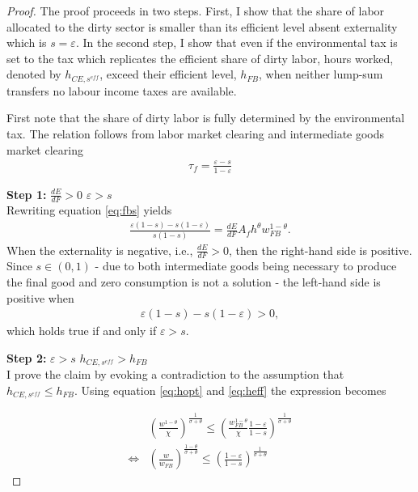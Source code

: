 \begin{proof}
The proof proceeds in two steps. First, I show that the share of labor allocated to the dirty sector is smaller than its efficient level absent externality which is $s=\varepsilon$.
In the second step, I show that even if the environmental tax is set to the tax which replicates the efficient share of dirty labor, hours worked, denoted by $h_{CE, s^{eff}}$, exceed their efficient level, $h_{FB}$, when neither lump-sum transfers no labour income taxes are available. 

First note that the share of dirty labor is fully determined by the environmental tax. The relation follows from labor market clearing and intermediate goods market clearing 
\begin{align}
\tau_f = \frac{\varepsilon-s}{1-\varepsilon}\label{eq:tauf}
\end{align}

\textbf{Step 1:} $\frac{dE}{dF}>0$ \ar $\varepsilon>s$\\
Rewriting equation \ref{eq:fbs} yields
\begin{align}
\frac{\varepsilon(1-s)-s(1-\varepsilon)}{s(1-s)}=\frac{dE}{dF}A_fh^\theta w_{FB}^{1-\theta}.
\end{align}
When the externality is negative, i.e., $\frac{dE}{dF}>0$, then the right-hand side is positive.
Since $s\in(0,1)$ - due to both intermediate goods being necessary to produce the final good and zero consumption is not a solution - the left-hand side is positive when
\begin{align}
\varepsilon(1-s)-s(1-\varepsilon)>0,
\end{align}
which holds true if and only if $\varepsilon>s$.

\textbf{Step 2:} $\varepsilon>s$ \ar $h_{CE, s^{eff}}>h_{FB}$\\
I prove the claim by evoking a contradiction to the assumption that $h_{CE, s^{eff}}\leq h_{FB}$. Using equation \ref{eq:hopt} and \ref{eq:heff} the expression becomes

\begin{align}
&\left(\frac{w^{1-\theta}}{\chi}\right)^{\frac{1}{\sigma+\theta}}\leq \left(\frac{w_{FB}^{1-\theta}}{\chi}\frac{1-\varepsilon}{1-s}\right)^\frac{1}{\sigma+\theta}
\\
\Leftrightarrow&\left(\frac{w}{w_{FB}}\right)^{\frac{1-\theta}{\sigma+\theta}}\leq \left(\frac{1-\varepsilon}{1-s}\right)^\frac{1}{\sigma+\theta}
\end{align}


\end{proof}
